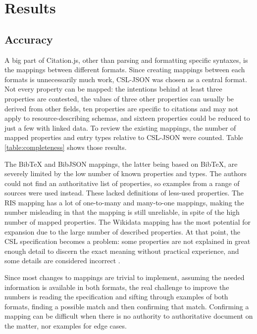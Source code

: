\documentclass[fleqn,10pt,lineno]{wlpeerj} %
\begin{document}
\section*{Results}

\subsection*{Accuracy}

A big part of Citation.js, other than parsing and formatting specific syntaxes, is the mappings between different formats. Since creating mappings between each formats is unnecessarily much work, CSL-JSON was chosen as a central format. Not every property can be mapped: the intentions behind at least three properties are contested, the values of three other properties can usually be derived from other fields, ten properties are specific to citations and may not apply to resource-describing schemas, and sixteen properties could be reduced to just a few with linked data. To review the existing mappings, the number of mapped properties and entry types relative to CSL-JSON were counted. Table \ref{table:completeness} shows those results.

The BibTeX and BibJSON mappings, the latter being based on BibTeX, are severely limited by the low number of known properties and types. The authors could not find an authoritative list of properties, so examples from a range of sources were used instead. These lacked definitions of less-used properties. The RIS mapping has a lot of one-to-many and many-to-one mappings, making the number misleading in that the mapping is still unreliable, in spite of the high number of mapped properties. The Wikidata mapping has the most potential for expansion due to the large number of described properties. At that point, the CSL specification becomes a problem: some properties are not explained in great enough detail to discern the exact meaning without practical experience, and some details are considered incorrect \citep{wiernik_inconsistencies_2018}.

Since most changes to mappings are trivial to implement, assuming the needed information is available in both formats, the real challenge to improve the numbers is reading the specification and sifting through examples of both formats, finding a possible match and then confirming that match. Confirming a mapping can be difficult when there is no authority to authoritative document on the matter, nor examples for edge cases.
\end{document}
